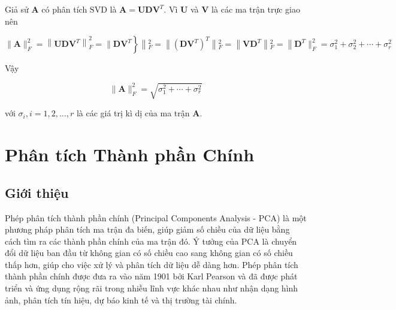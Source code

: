 \documentclass[12pt,a4paper,oneside]{report}
\numberwithin{equation}{section}
\begin{document}
Giả sử $\mathbf{A}$ có phân tích $\mathrm{SVD}$ là $\mathbf{A}=\mathbf{U D V}^{T}$. Vì $\mathbf{U}$ và $\mathbf{V}$ là các ma trận trực giao nên

$$
\left.\|\mathbf{A}\|_{F}^{2}=\left\|\mathbf{U D V}^{T}\right\|_{F}^{2}=\| \mathbf{D V}^{T}\right\}\left\|_{F}^{2}=\right\|\left(\mathbf{D V}^{T}\right)^{T}\left\|_{F}^{2}=\right\| \mathbf{V D}^{T}\left\|_{F}^{2}=\right\| \mathbf{D}^{T} \|_{F}^{2}=\sigma_{1}^{2}+\sigma_{2}^{2}+\cdots+\sigma_{r}^{2}
$$

Vậy

$$
\|\mathbf{A}\|_{F}^{2}=\sqrt{\sigma_{1}^{2}+\cdots+\sigma_{r}^{2}}
$$

với $\sigma_{i}, i=1,2, \ldots, r$ là các giá trị kì dị của ma trận $\mathbf{A}$.

\chapter{ Phân tích Thành phần Chính }
\section{Giới thiệu}
Phép phân tích thành phần chính (Principal Components Analysis - PCA) là một phương pháp phân tích ma trận đa biến, giúp giảm số chiều của dữ liệu bằng cách tìm ra các thành phần chính của ma trận đó. Ý tưởng của PCA là chuyển đổi dữ liệu ban đầu từ không gian có số chiều cao sang không gian có số chiều thấp hơn, giúp cho việc xử lý và phân tích dữ liệu dễ dàng hơn.
Phép phân tích thành phần chính được đưa ra vào năm 1901 bởi Karl Pearson và đã được phát triển và ứng dụng rộng rãi trong nhiều lĩnh vực khác nhau như nhận dạng hình ảnh, phân tích tín hiệu, dự báo kinh tế và thị trường tài chính.
\end{document}
